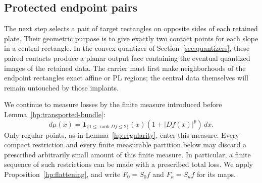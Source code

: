 \documentclass[11pt]{article}
\numberwithin{equation}{section}
\theoremstyle{definition}
\theoremstyle{remark}
\begin{document}
\subsection{Protected endpoint pairs}

The next step selects a pair of target rectangles on opposite sides of
each retained plate.  Their geometric purpose is to give exactly two
contact points for each slope in a central rectangle.  In the convex
quantizer of Section~\ref{sec:quantizers}, these paired contacts produce
a planar output face containing the eventual quantized images of the
retained data.  The carrier must
first make neighborhoods of the endpoint rectangles exact affine or
PL regions; the central data themselves will remain untouched by those
implants.

We continue to measure losses by the finite measure introduced before
Lemma~\ref{hp:transported-bundle}:
\[
 d\mu(x)=\mathbf 1_{\{1\leq\operatorname{rank} Df\leq2\}}(x)
             (1+|Df(x)|^p)\,dx.
\]
Only regular points, as in Lemma~\ref{hp:regularity}, enter this measure.
Every compact restriction and every finite measurable partition below may
discard a prescribed arbitrarily small amount of this finite measure.
In particular, a finite sequence of such restrictions can be made with a
prescribed total loss.  We apply Proposition~\ref{hp:flattening}, and write
$F_0=S_0f$ and $F_\kappa=S_\kappa f$ for its maps.
\end{document}
